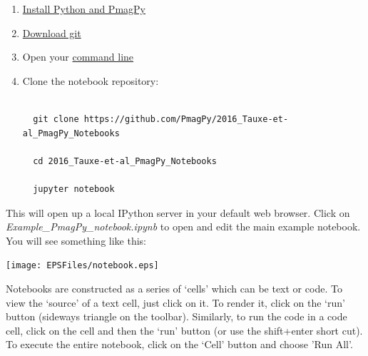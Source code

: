\documentclass[11pt]{book}
\begin{document}
{{\begin{enumerate}
\item \href{#getting_python}{Install Python and PmagPy}
\item \href{https://git-scm.com/downloads}{Download git}
\item Open your \href{#command_line}{command line}
\item Clone the notebook repository:
\begin{verbatim}

  git clone https://github.com/PmagPy/2016_Tauxe-et-al_PmagPy_Notebooks

  cd 2016_Tauxe-et-al_PmagPy_Notebooks

  jupyter notebook
\end{verbatim}
\end{enumerate}

This will open up a local IPython server in your default web browser. Click on \textit{Example\_PmagPy\_notebook.ipynb} to open and edit the main example notebook. You will see something like this:

\texttt{[image: EPSFiles/notebook.eps]}

Notebooks are constructed as a series of `cells' which can be text or code.  To view the `source' of a text cell, just click on it.  To render it, click on the `run' button (sideways triangle on the toolbar).  Similarly, to run the code in a code cell, click on the cell and then the `run' button (or use the shift+enter short cut).   To execute the entire notebook, click on the `Cell' button and choose 'Run All'.


}}
\end{document}
